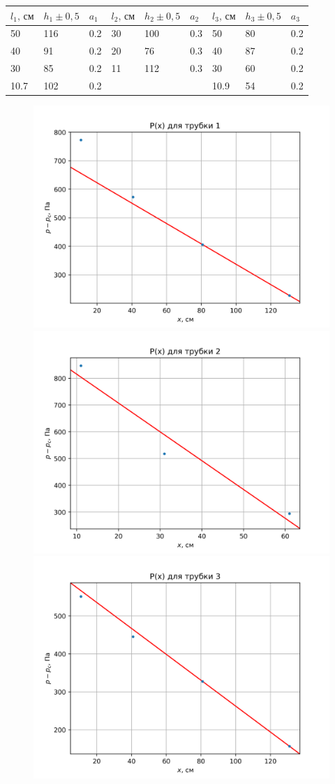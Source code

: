 \begin{table}[!ht]
    \centering
    \begin{tabular}{|l|l|l||l|l|l||l|l|l|}
    \hline
        $l_1,\,\text{см}$ & $h_1\pm 0{,}5$ & $a_1$ & $l_2,\,\text{см}$ & $h_2\pm 0{,}5$ & $a_2$ & $l_3,\,\text{см}$ & $h_3\pm 0{,}5$ & $a_3$ \\ \hline
        50 & 116 & 0.2 & 30 & 100 & 0.3 &  50 & 80 & 0.2\\ \hline
        40 & 91 & 0.2 & 20 & 76 & 0.3 & 40 & 87 & 0.2 \\ \hline
        30 & 85 & 0.2 & 11 & 112 & 0.3 & 30 & 60 & 0.2\\ \hline
        10.7 & 102 & 0.2 & & & & 10.9 & 54 & 0.2 \\ \hline
    \end{tabular}
\end{table}

\begin{figure}[ht!]
    \centering\includegraphics[width=0.5\linewidth]{img/data11.png}
    \centering\includegraphics[width=0.5\linewidth]{img/data12.png}
    \centering\includegraphics[width=0.5\linewidth]{img/data13.png}
\end{figure}

